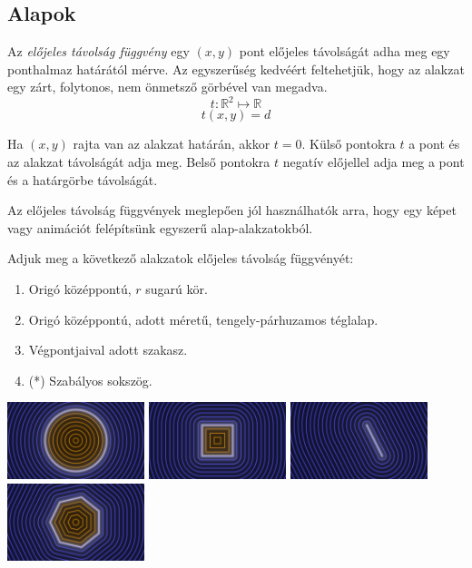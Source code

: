 \subsection{Alapok}

\begin{tcolorbox}[title=Előjeles távolság függvény (signed distance function)]
  Az \emph{előjeles távolság függvény} egy $(x,y)$ pont előjeles távolságát adha meg egy ponthalmaz határától mérve.
  Az egyszerűség kedvéért feltehetjük, hogy az alakzat egy zárt, folytonos, nem önmetsző görbével van megadva.
  $$ t: \mathbb{R}^2 \mapsto \mathbb{R}$$
  $$ t(x, y) = d$$

  Ha $(x,y)$ rajta van az alakzat határán, akkor $t = 0$. Külső pontokra $t$ a pont és az alakzat távolságát adja meg.
  Belső pontokra $t$ negatív előjellel adja meg a pont és a határgörbe távolságát.
  
  Az előjeles távolság függvények meglepően jól használhatók arra, hogy egy képet vagy animációt felépítsünk egyszerű
  alap-alakzatokból.
  \end{tcolorbox}

\matfeladatok


Adjuk meg a következő alakzatok előjeles távolság függvényét:

\begin{enumerate}
  \item Origó középpontú, $r$ sugarú kör.
  \item Origó középpontú, adott méretű, tengely-párhuzamos téglalap.
  \item Végpontjaival adott szakasz.
  \item (*) Szabályos sokszög.
\end{enumerate}

\includegraphics[width=4cm]{images/sdCircle.png}
\includegraphics[width=4cm]{images/sdSquare.png}
\includegraphics[width=4cm]{images/sdSegment.png}
\includegraphics[width=4cm]{images/sdNgon.png}


